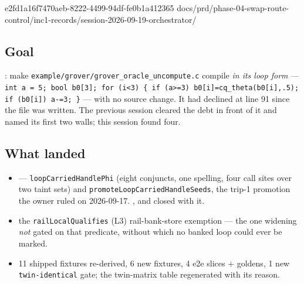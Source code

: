 %
  {e2fd1a16}{f7470aeb-8222-4499-94df-fe0b1a412365}%
  {docs/prd/phase-04-swap-route-control/inc1-records/session-2026-09-19-orchestrator/}

\subsection*{Goal}
: make \texttt{example/grover/grover\_oracle\_uncompute.c} compile \emph{in its loop form} ---
\texttt{int a = 5; bool b0[3]; for (i<3) \{ if (a>=3) b0[i]=cq\_theta(b0[i],.5); if (b0[i]) a-=3; \}}
--- with no source change. It had declined at line 91 since the file was written. The previous session
cleared the debt in front of it and named its first two walls; this session found four.

\subsection*{What landed}
\begin{itemize}
  \item {} --- \texttt{loopCarriedHandlePhi} (eight conjuncts, one spelling, four call sites
        over two taint sets) and \texttt{promoteLoopCarriedHandleSeeds}, the trip-1 promotion the
        owner ruled on 2026-09-17. ,  and  closed with it.
  \item the \texttt{railLocalQualifies} (L3) rail-bank-store exemption --- the one widening \emph{not}
        gated on that predicate, without which no banked loop could ever be marked.
  \item 11 shipped fixtures re-derived, 6 new fixtures, 4 e2e slices + goldens, 1 new
        \texttt{twin-identical} gate; the twin-matrix table regenerated with its reason.
\end{itemize}

